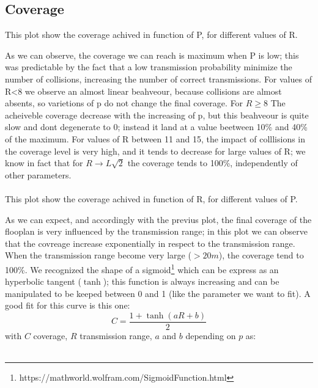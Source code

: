 \subsection{Coverage}
This plot show the coverage achived in function of P, for different values of R.
\begin{figure}[H]
    \begin{center}
        \scalebox{0.42}{ }
    \end{center}
    \vspace*{-1cm}
\end{figure}
As we can observe, the coverage we can reach is maximum when P is low; this was predictable by the fact that a low transmission
probability minimize the number of collisions, increasing the number of correct transmissions. For values of R<8 we observe an almost
linear beahveour, because collisions are almost absents, so varietions of p do not change the final coverage. 
For $R\geq8$ The acheiveble coverage decrease with the increasing of p, but this beahveour is quite slow and
dont degenerate to 0; instead it land at a value beetween 10\% and 40\% of the maximum. For values of R between 11 and 15, 
the impact of colllisions in the coverage level is very high, and it tends to decrease for large values of R; we know in fact 
that for $R\to L\sqrt{2}$ the coverage tends to 100\%, independently of other parameters.\\\\
This plot show the coverage achived in function of R, for different values of P.
\begin{figure}[H]
    \begin{center}
        \scalebox{0.9}{}
    \end{center}
    \vspace*{-1cm}
\end{figure}
As we can expect, and accordingly with the previus plot, the final coverage of the flooplan is very
influenced by the transmission range; in this plot we can observe that the covreage increase exponentially
in respect to the transmission range. When the transmission range become very large ($>20m$),
the coverage tend to 100\%. We recognized the shape of a sigmoid\footnote{https://mathworld.wolfram.com/SigmoidFunction.html} 
which can be express as an hyperbolic tangent ($ \tanh $); this function is always increasing and can be manipulated
to be keeped between 0 and 1 (like the parameter we want to fit). A good fit for this curve is this one:\\
\begin{equation*}
    C =  \frac{1+\tanh(aR+b)}{2} 
\end{equation*} 
with $C$ coverage, $R$ transmission range, $a$ and $b$ depending on $p$ as:\\
\\
